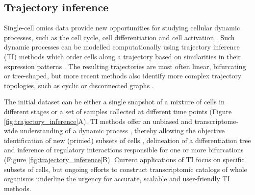 \subsection{Trajectory inference}
Single-cell omics data provide new opportunities for studying cellular dynamic processes, such as the cell cycle, cell differentiation and cell activation \cite{tanay_scalingsinglecellgenomics_2017,etzrodt_quantitativesinglecellapproaches_2014}. Such dynamic processes can be modelled computationally using trajectory inference (TI) methods which order cells along a trajectory based on similarities in their expression patterns \cite{trapnell_definingcelltypes_2015,cannoodt_computationalmethodstrajectory_2016,moon_manifoldlearningbasedmethods_2018}. The resulting trajectories are most often linear, bifurcating or tree-shaped, but more recent methods also identify more complex trajectory topologies, such as cyclic \cite{liu_reconstructingcellcycle_2017} or disconnected graphs \cite{wolf_graphabstractionreconciles_2017}. 

The initial dataset can be either a single snapshot of a mixture of cells in different stages or a set of samples collected at different time points (Figure \ref{fig:trajectory_inference}A). 
TI methods offer an unbiased and transcriptome-wide understanding of a dynamic process \cite{tanay_scalingsinglecellgenomics_2017}, thereby allowing the objective identification of new (primed) subsets of cells \cite{schlitzer_identificationcdc1cdc2committed_2015}, delineation of a differentiation tree \cite{velten_humanhaematopoieticstem_2017,see_mappinghumandc_2017} and inference of regulatory interactions responsible for one or more bifurcations \cite{aibar_scenicsinglecellregulatory_2017} (Figure \ref{fig:trajectory_inference}B). Current applications of TI focus on specific subsets of cells, but ongoing efforts to construct transcriptomic catalogs of whole organisms \cite{regev_humancellatlas_2017,han_mappingmousecell_2018,schaum_singlecelltranscriptomics20_2018} underline the urgency for accurate, scalable \cite{aibar_scenicsinglecellregulatory_2017,angerer_singlecellsmake_2017} and user-friendly TI methods.

